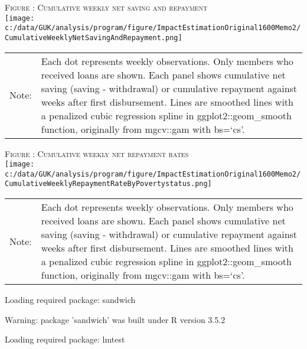 \hfil\textsc{\footnotesize Figure \thefigure: Cumulative weekly net saving and repayment\label{fig weeklysavingrepay}}\\
\hfil\texttt{[image: c:/data/GUK/analysis/program/figure/ImpactEstimationOriginal1600Memo2/CumulativeWeeklyNetSavingAndRepayment.png]}\\
\renewcommand{\arraystretch}{1}
\hfil\begin{tabular}{>{\hfill\scriptsize}p{1cm}<{}>{\scriptsize}p{12cm}<{\hfill}}
Note:& Each dot represents weekly observations. Only members who received loans are shown. Each panel shows cumulative net saving (saving - withdrawal) or cumulative repayment against weeks after first disbursement. Lines are smoothed lines with a penalized cubic regression spline in \textsf{ggplot2::geom\_smooth} function, originally from \textsf{mgcv::gam} with \textsf{bs=`cs'}. \\[-1ex]
\end{tabular}


\hfil\textsc{\footnotesize Figure \thefigure: Cumulative weekly net repayment rates\label{fig weeklysavingrepayrate}}\\
\hfil\texttt{[image: c:/data/GUK/analysis/program/figure/ImpactEstimationOriginal1600Memo2/CumulativeWeeklyRepaymentRateByPovertystatus.png]}\\
\renewcommand{\arraystretch}{1}
\hfil\begin{tabular}{>{\hfill\scriptsize}p{1cm}<{}>{\scriptsize}p{12cm}<{\hfill}}
Note:& Each dot represents weekly observations. Only members who received loans are shown. Each panel shows cumulative net saving (saving - withdrawal) or cumulative repayment against weeks after first disbursement. Lines are smoothed lines with a penalized cubic regression spline in \textsf{ggplot2::geom\_smooth} function, originally from \textsf{mgcv::gam} with \textsf{bs=`cs'}. \\[-1ex]
\end{tabular}






\begin{Schunk}
\begin{Soutput}
Loading required package: sandwich
\end{Soutput}
\begin{Soutput}
Warning: package 'sandwich' was built under R version 3.5.2
\end{Soutput}
\begin{Soutput}
Loading required package: lmtest
\end{Soutput}
\end{Schunk}










